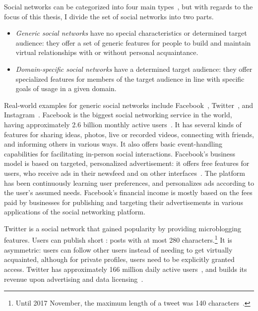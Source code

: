 Social networks can be categorized into four main types~\cite{thelwall2009}, but with regards to the focus of this thesis, I divide the set of social networks into two parts.

\begin{itemize}
\item \emph{Generic social networks} have no special characteristics or determined target audience: they offer a set of generic features for people to build and maintain virtual relationships with or without personal acquaintance.
\item \emph{Domain-specific social networks} have a determined target audience: they offer specialized features for members of the target audience in line with specific goals of usage in a given domain.
\end{itemize}

Real-world examples for generic social networks include Facebook~\cite{aboutfacebook}, Twitter~\cite{abouttwitter}, and Instagram~\cite{aboutinstagram}. Facebook is the biggest social networking service in the world, having approximately 2.6 billion monthly active users~\cite{facebook2020q1report}. It has several kinds of features for sharing ideas, photos, live or recorded videos, connecting with friends, and informing others in various ways. It also offers basic event-handling capabilities for facilitating in-person social interactions. Facebook's business model is based on targeted, personalized advertisement: it offers free features for users, who receive ads in their newsfeed and on other interfaces~\cite{fb-business-model}. The platform has been continuously learning user preferences, and personalizes ads according to the user's assumed needs. Facebook's financial income is mostly based on the fees paid by businesses for publishing and targeting their advertisements in various applications of the social networking platform.

Twitter is a social network that gained popularity by providing microblogging features. Users can publish short : posts with at most 280 characters.\footnote{Until 2017 November, the maximum length of a tweet was 140 characters~\cite{twitter-doubling-character-limit}.} It is asymmetric: users can follow other users instead of needing to get virtually acquainted, although for private profiles, users need to be explicitly granted access. Twitter has approximately 166 million daily active users~\cite{twitter2020q1report}, and builds its revenue upon advertising and data licensing~\cite{twitter-business-model}.

